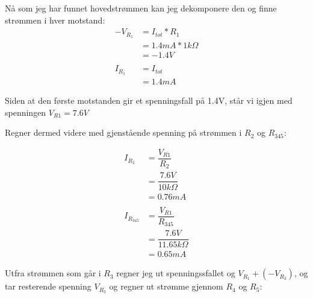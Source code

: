 \documentclass{article}
\begin{document}
                Nå som jeg har funnet hovedstrømmen kan jeg dekomponere den og finne strømmen i hver motstand:
                    \begin{equation*}
                        \begin{split}
                            -V_{R_1} &= I_{tot} * R_1 \\
                                    &= 1.4mA * 1k\Omega \\
                                    &= -1.4V \\
                                    \\
                            I_{R_1} &= I_{tot} \\
                                    &= 1.4mA
                        \end{split}
                    \end{equation*}

                Siden at den første motstanden gir et spenningsfall på 1.4V, 
                står vi igjen med spenningen \(V_{R1} = 7.6V\) \linebreak

                Regner dermed videre med gjenstående spenning på strømmen i \(R_2\) og \(R_{345}\):

                    \begin{equation*}
                        \begin{split}
                            I_{R_2} &= \dfrac{V_{R1}}{R_2} \\
                            &= \dfrac{7.6V}{10k\Omega} \\
                            &= 0.76mA \\
                            \\
                            I_{R_{345}} &= \dfrac{V_{R1}}{R_{345}} \\
                                    &= \dfrac{7.6V}{11.65k\Omega} \\
                                    &= 0.65mA
                        \end{split}
                    \end{equation*}
                
                    Utfra strømmen som går i \(R_3\) regner jeg ut spenningssfallet og \(V_{R_1} + (-V_{R_3}) \), 
                    og tar resterende spenning \(V_{R_3}\) og regner ut strømme gjennom \(R_4\) og \(R_5\):
\end{document}
